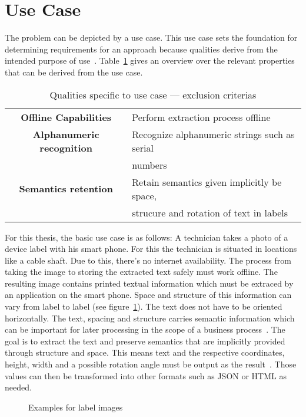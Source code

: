 \section{Use Case}
The problem can be depicted by a use case.
This use case sets the foundation for determining requirements for an
approach because qualities derive from the intended purpose of
use~\citep{siebert_construction_2021}.
Table~\ref{tb:useCaseQualities} gives an overview over the relevant properties that can be derived
from the use case.
\begin{table}[ht]
    \centering\scriptsize
    \begin{tabular}{c l}
        \textbf{Offline Capabilities} & Perform extraction process offline \\
        \textbf{Alphanumeric recognition}    & Recognize alphanumeric strings such as serial \\
                                    & numbers \\
        \textbf{Semantics retention} & Retain semantics given implicitly be space, \\
                            & strucure and rotation of text in labels \\
    \end{tabular}
    \caption{Qualities specific to use case --- exclusion criterias\label{tb:useCaseQualities}}
\end{table}
For this thesis, the basic use case is as follows:
A technician takes a photo of a device label with his smart phone.
For this the technician is situated in locations like a cable shaft.
Due to this, there's no internet availability.
The process from taking the image to storing the extracted text safely must work offline.
The resulting image contains printed textual information which must be extraced by an application on
the smart phone.
Space and structure of this information can vary from label to label (see figure~\ref{fig:examples}).
The text does not have to be oriented horizontally.
The text, spacing and structure carries semantic information which can be important for later
processing in the scope of a business process~\citep{chen_text_2021}.
The goal is to extract the text and preserve semantics that are implicitly provided through
structure and space.
This means text and the respective coordinates, height, width and a possible rotation angle must
be output as the result~\citep{yang_learning_2021}.
Those values can then be transformed into other formats such as JSON or HTML as needed.
\begin{figure}[h]
    \centering
    \caption{Examples for label images\label{fig:examples}}
\end{figure}
